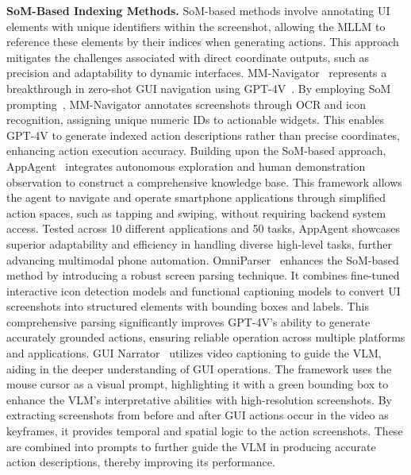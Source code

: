 \noindent\textbf{SoM-Based Indexing Methods.}
SoM-based methods involve annotating UI elements with unique identifiers within the screenshot, allowing the MLLM to reference these elements by their indices when generating actions. This approach mitigates the challenges associated with direct coordinate outputs, such as precision and adaptability to dynamic interfaces.
MM-Navigator~\cite{yan2023gpt} represents a breakthrough in zero-shot GUI navigation using GPT-4V~\cite{achiam2023gpt}. By employing SoM prompting~\cite{yang2023setofmark}, MM-Navigator annotates screenshots through OCR and icon recognition, assigning unique numeric IDs to actionable widgets. This enables GPT-4V to generate indexed action descriptions rather than precise coordinates, enhancing action execution accuracy.
Building upon the SoM-based approach, AppAgent~\cite{zhang2023appagent} integrates autonomous exploration and human demonstration observation to construct a comprehensive knowledge base. This framework allows the agent to navigate and operate smartphone applications through simplified action spaces, such as tapping and swiping, without requiring backend system access. Tested across 10 different applications and 50 tasks, AppAgent showcases superior adaptability and efficiency in handling diverse high-level tasks, further advancing multimodal phone automation.
OmniParser~\cite{lu2024omniparser} enhances the SoM-based method by introducing a robust screen parsing technique. It combines fine-tuned interactive icon detection models and functional captioning models to convert UI screenshots into structured elements with bounding boxes and labels. This comprehensive parsing significantly improves GPT-4V's ability to generate accurately grounded actions, ensuring reliable operation across multiple platforms and applications.
GUI Narrator~\cite{wu2024gui} utilizes video captioning to guide the VLM, aiding in the deeper understanding of GUI operations. The framework uses the mouse cursor as a visual prompt, highlighting it with a green bounding box to enhance the VLM's interpretative abilities with high-resolution screenshots. By extracting screenshots from before and after GUI actions occur in the video as keyframes, it provides temporal and spatial logic to the action screenshots. These are combined into prompts to further guide the VLM in producing accurate action descriptions, thereby improving its performance.



